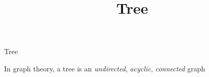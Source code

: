 \documentclass{beamer}
\title{Tree}
\begin{document}
\frame{
  \titlepage
}

\begin{frame}{Tree}
  
  \begin{block}{}
    In graph theory, a tree is an \emph{undirected}, \emph{acyclic}, \emph{connected} graph
    
%      
%      
%      
%      
%      
%      
%      
%      
%    

\end{block}
\end{frame}
\end{document}
